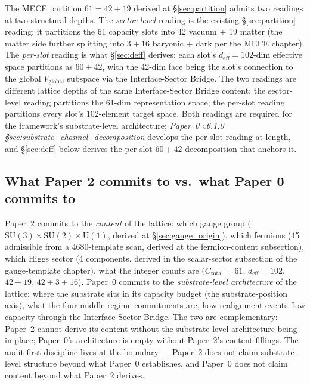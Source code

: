\documentclass[11pt]{article}
\begin{document}
The MECE partition $61 = 42 + 19$ derived at \S\ref{sec:partition} admits two readings at two structural depths. The \emph{sector-level} reading is the existing \S\ref{sec:partition} reading: it partitions the 61 capacity slots into 42 vacuum + 19 matter (the matter side further splitting into $3 + 16$ baryonic + dark per the MECE chapter). The \emph{per-slot} reading is what \S\ref{sec:deff} derives: each slot's $d_{\mathrm{eff}} = 102$-dim effective space partitions as $60 + 42$, with the 42-dim face being the slot's connection to the global $V_{\mathrm{global}}$ subspace via the Interface-Sector Bridge. The two readings are different lattice depths of the same Interface-Sector Bridge content: the sector-level reading partitions the 61-dim representation space; the per-slot reading partitions every slot's 102-element target space. Both readings are required for the framework's substrate-level architecture; \emph{Paper~0 v6.1.0 \S sec:substrate\_channel\_decomposition} develops the per-slot reading at length, and \S\ref{sec:deff} below derives the per-slot $60 + 42$ decomposition that anchors it.

\subsection{What Paper 2 commits to vs.\ what Paper 0 commits to}\label{sec:substrate-level-reading-boundary}

Paper~2 commits to the \emph{content} of the lattice: which gauge group ($\mathrm{SU}(3) \times \mathrm{SU}(2) \times \mathrm{U}(1)$, derived at \S\ref{sec:gauge_origin}), which fermions (45 admissible from a 4680-template scan, derived at the fermion-content subsection), which Higgs sector (4 components, derived in the scalar-sector subsection of the gauge-template chapter), what the integer counts are ($C_{\mathrm{total}} = 61$, $d_{\mathrm{eff}} = 102$, $42 + 19$, $42 + 3 + 16$). Paper~0 commits to the \emph{substrate-level architecture} of the lattice: where the substrate sits in its capacity budget (the substrate-position axis), what the four middle-regime commitments are, how realignment events flow capacity through the Interface-Sector Bridge. The two are complementary: Paper~2 cannot derive its content without the substrate-level architecture being in place; Paper~0's architecture is empty without Paper~2's content fillings. The audit-first discipline lives at the boundary --- Paper~2 does not claim substrate-level structure beyond what Paper~0 establishes, and Paper~0 does not claim content beyond what Paper~2 derives.
\end{document}
